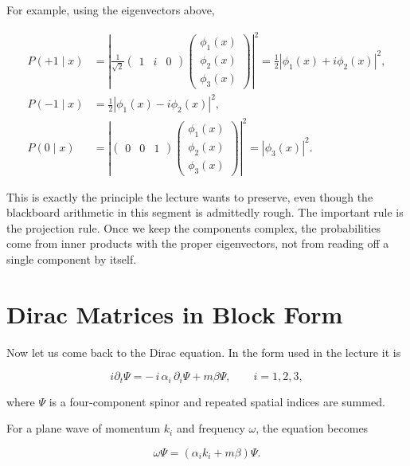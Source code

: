 For example, using the eigenvectors above,

\begin{align}
P(+1\mid x)
&=
\left|
\frac{1}{\sqrt2}
\begin{pmatrix}
1&i&0
\end{pmatrix}
\begin{pmatrix}
\phi_1(x)\\
\phi_2(x)\\
\phi_3(x)
\end{pmatrix}
\right|^2
=
\frac12\left|\phi_1(x)+i\phi_2(x)\right|^2,\\
P(-1\mid x)
&=
\frac12\left|\phi_1(x)-i\phi_2(x)\right|^2,\\
P(0\mid x)
&=
\left|
\begin{pmatrix}
0&0&1
\end{pmatrix}
\begin{pmatrix}
\phi_1(x)\\
\phi_2(x)\\
\phi_3(x)
\end{pmatrix}
\right|^2
=
|\phi_3(x)|^2.
\end{align}

This is exactly the principle the lecture wants to preserve, even though the blackboard arithmetic in this segment is admittedly rough. The important rule is the projection rule. Once we keep the components complex, the probabilities come from inner products with the proper eigenvectors, not from reading off a single component by itself.

\section{Dirac Matrices in Block Form}

Now let us come back to the Dirac equation. In the form used in the lecture it is

\begin{equation}
i\partial_t\Psi
=
-\,i\,\alpha_i\,\partial_i\Psi
+
m\beta\Psi,
\qquad i=1,2,3,
\end{equation}

where \(\Psi\) is a four-component spinor and repeated spatial indices are summed.

For a plane wave of momentum \(k_i\) and frequency \(\omega\), the equation becomes

\begin{equation}
\omega \Psi = \left(\alpha_i k_i + m\beta\right)\Psi.
\end{equation}

